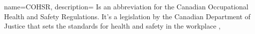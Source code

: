 {
  name={COHSR},
  description={
    Is an abbreviation for the Canadian Occupational Health and Safety Regulations.
    It's a legislation by the Canadian Department of Justice that sets the standards for health
    and safety in the workplace
  },
}

